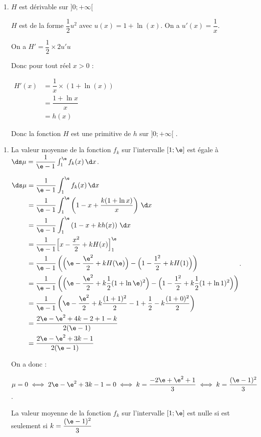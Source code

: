\begin{enumerate}
	\item %
	
	$H$ est dérivable sur $] 0 ;+\infty[$ 
	
	$H$ est de la forme $\dfrac{1}{2}u^2$ avec $u(x) = 1 + \ln(x)$. On a  $u'(x) = \dfrac{1}{x}$. 
	
	On a $H'= \dfrac{1}{2} \times 2 u'u $ 
	
	Donc pour tout réel $x>0$ : 
	
	$\begin{aligned} H'(x) &= \dfrac{1}{x} \times \left(1 + \ln(x) \right) \\
		&= \dfrac{1+\ln x}{x} \\
		&=h(x)
		\end{aligned}$	
		
		Donc la fonction $H$ est une primitive de $h$ sur $] 0 ;+\infty[$ . 
	
	
\end{enumerate}



\begin{enumerate}[resume]
	\item La valeur moyenne de la fonction $f_{k}$ sur l'intervalle $[ 1 ; \e]$ est égale à $\ds \mu= \dfrac{1}{\e-1} \int_1^{\e} f_k(x) \,\d x$. 
	
	
	
	$\begin{aligned}  \ds \mu& = \dfrac{1}{\e-1} \int_1^{\e} f_k(x) \,\d x\\
		&= \dfrac{1}{\e-1} \int_1^{\e}   \left(1-x+\dfrac{k(1+\ln x)}{x}  \right)\,\d x\\
		&= \dfrac{1}{\e-1} \int_1^{\e}   \left(1-x+kh(x)  \right)\,\d x\\
		&= \dfrac{1}{\e-1} \Big[x-\dfrac{x^2}{2} + kH(x)\Big]_1^{\e} \\
		&= \dfrac{1}{\e-1} \left( \Big(\e-\dfrac{\e^2}{2} + kH(\e)\Big) -  \Big(1-\dfrac{1^2}{2} + kH(1)\Big)  \right) \\
		&= \dfrac{1}{\e-1} \left( \Big(\e-\dfrac{\e^2}{2} + k\dfrac{1}{2}(1+\ln \e)^{2} \Big) -  \Big(1-\dfrac{1^2}{2} + k\dfrac{1}{2}(1+\ln 1)^{2}\Big)  \right) \\
			&= \dfrac{1}{\e-1} \left( \e-\dfrac{\e^2}{2} + k\dfrac{(1+1)^2}{2} -  1+\dfrac{1}{2} - k\dfrac{(1+0)^2}{2}\right) \\
		&= \dfrac{ 2\e-\e^2 + 4k -  2+1- k}{2(\e-1)}\\
			&= \dfrac{ 2\e-\e^2 + 3k -  1}{2(\e-1)}\\
		\end{aligned}$.
	
	
	
	
On a donc : 

$\mu =0 \iff 2\e-\e^2 + 3k -  1 =0 \iff   k= \dfrac{-2\e+\e^2 +   1}{3} \iff k= \dfrac{(\e-1)^2}{3}$. 


	
	La valeur moyenne de la fonction $f_{k}$ sur l'intervalle $[ 1 ; \e]$ est  nulle si est seulement si $k=   \dfrac{(\e-1)^2}{3}$
\end{enumerate}



